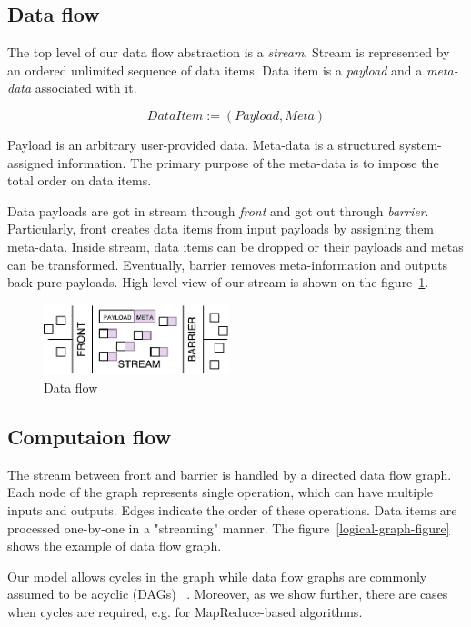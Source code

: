
\label {fs-model}
\subsection{Data flow}

The top level of our data flow abstraction is a {\it stream}. Stream is represented by an ordered unlimited sequence of data items. Data item is a {\it payload} and a {\it meta-data} associated with it. 

\[DataItem := (Payload, Meta)\]

Payload is an arbitrary user-provided data. Meta-data is a structured system-assigned information. The primary purpose of the meta-data is to impose the total order on data items. 

Data payloads are got in stream through {\it front} and got out through {\it barrier}. Particularly, front creates data items from input payloads by assigning them meta-data. Inside stream, data items can be dropped or their payloads and metas can be transformed. Eventually, barrier removes meta-information and outputs back pure payloads. High level view of our stream is shown on the figure~\ref{stream}.

\begin{figure}[htbp]
  \centering
  \includegraphics[width=0.48\textwidth]{pics/stream}
  \caption{Data flow}
  \label {stream}
\end{figure}

\subsection{Computaion flow}

The stream between front and barrier is handled by a directed data flow graph. Each node of the graph represents single operation, which can have multiple inputs and outputs. Edges indicate the order of these operations. Data items are processed one-by-one in a "streaming" manner. The figure~\ref{logical-graph-figure} shows the example of data flow graph.

Our model allows cycles in the graph while data flow graphs are commonly assumed to be acyclic (DAGs) 
~\cite{Zaharia:2016:ASU:3013530.2934664, Carbone:2017:SMA:3137765.3137777}. Moreover, as we show further, there are cases when cycles are required, e.g. for MapReduce-based algorithms. 

